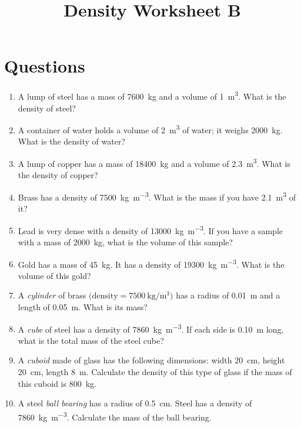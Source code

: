 \documentclass{article}
\title{Density Worksheet B}
\author{}
\date{}
\begin{document}
\maketitle

\section*{Questions}

\begin{enumerate}
\item A lump of steel has a mass of \SI{7600}{\kilogram} and a volume of \SI{1}{\metre\cubed}. What is the density of steel?

\item A container of water holds a volume of \SI{2}{\metre\cubed} of water; it weighs \SI{2000}{\kilogram}. What is the density of water?

\item A lump of copper has a mass of \SI{18400}{\kilogram} and a volume of \SI{2.3}{\metre\cubed}. What is the density of copper?

\item Brass has a density of \SI{7500}{\kilogram\per\metre\cubed}. What is the mass if you have \SI{2.1}{\metre\cubed} of it?

\item Lead is very dense with a density of \SI{13000}{\kilogram\per\metre\cubed}. If you have a sample with a mass of \SI{2000}{\kilogram}, what is the volume of this sample?

\item Gold has a mass of \SI{45}{\kilogram}.  It has a density of \SI{19300}{\kilogram\per\metre\cubed}.  What is the volume of this gold?

\item A \emph{cylinder} of brass \(\bigl(\text{density} = \SI{7500}{\kilogram\per\metre\cubed}\bigr)\) has a radius of \SI{0.01}{\metre} and a length of \SI{0.05}{\metre}. What is its mass?

\item A \emph{cube} of steel has a density of \SI{7860}{\kilogram\per\metre\cubed}. If each side is \SI{0.10}{\metre} long, what is the total mass of the steel cube?

\item A \emph{cuboid} made of glass has the following dimensions: width \SI{20}{\centi\metre}, height \SI{20}{\centi\metre}, length \SI{8}{\metre}.  Calculate the density of this type of glass if the mass of this cuboid is \SI{800}{\kilogram}.

\item A steel \emph{ball bearing} has a radius of \SI{0.5}{\centi\metre}. Steel has a density of \SI{7860}{\kilogram\per\metre\cubed}. Calculate the mass of the ball bearing.

\end{enumerate}
\end{document}
